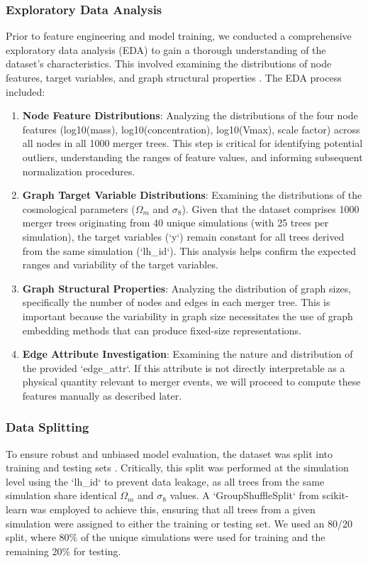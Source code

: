 \documentclass[twocolumn]{aastex631}
\begin{document}
\subsubsection{Exploratory Data Analysis}
Prior to feature engineering and model training, we conducted a comprehensive exploratory data analysis (EDA) to gain a thorough understanding of the dataset's characteristics.
This involved examining the distributions of node features, target variables, and graph structural properties \citep{haghighi2023analyzingastronomicaldatamachine}.
The EDA process included:
\begin{enumerate}
    \item \textbf{Node Feature Distributions}: Analyzing the distributions of the four node features (log10(mass), log10(concentration), log10(Vmax), scale factor) across all nodes in all 1000 merger trees. This step is critical for identifying potential outliers, understanding the ranges of feature values, and informing subsequent normalization procedures.
    \item \textbf{Graph Target Variable Distributions}: Examining the distributions of the cosmological parameters ($\Omega_m$ and $\sigma_8$). Given that the dataset comprises 1000 merger trees originating from 40 unique simulations (with 25 trees per simulation), the target variables (`y`) remain constant for all trees derived from the same simulation (`lh_id`). This analysis helps confirm the expected ranges and variability of the target variables.
    \item \textbf{Graph Structural Properties}: Analyzing the distribution of graph sizes, specifically the number of nodes and edges in each merger tree. This is important because the variability in graph size necessitates the use of graph embedding methods that can produce fixed-size representations.
    \item \textbf{Edge Attribute Investigation}: Examining the nature and distribution of the provided `edge_attr`. If this attribute is not directly interpretable as a physical quantity relevant to merger events, we will proceed to compute these features manually as described later.
\end{enumerate}
\citep{kent2017editorialtechniquesmethodsastrophysical,giri2025astronomycalcpythontoolkitteaching}

\subsubsection{Data Splitting}
To ensure robust and unbiased model evaluation, the dataset was split into training and testing sets \citep{frailis2004perspectsastrophysicaldatabases,onose2016scalablesplittingalgorithmsbigdata}. Critically, this split was performed at the simulation level using the `lh_id` to prevent data leakage, as all trees from the same simulation share identical $\Omega_m$ and $\sigma_8$ values. A `GroupShuffleSplit` from scikit-learn was employed to achieve this, ensuring that all trees from a given simulation were assigned to either the training or testing set. We used an 80/20 split, where 80\% of the unique simulations were used for training and the remaining 20\% for testing.
\end{document}
